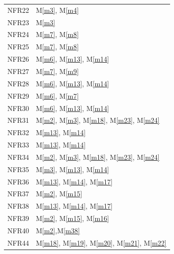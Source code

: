 \documentclass[12pt, titlepage]{article}
\newcommand{\mref}[1]{M\ref{#1}}
\begin{document}
\begin{longtable}{p{} p{}}
		NFR22 & \mref{m3}, \mref{m4} \\
		NFR23 & \mref{m3} \\
		\hline 
		\newpage
		\hline
		NFR24 & \mref{m7}, \mref{m8} \\
		NFR25 & \mref{m7}, \mref{m8} \\
		NFR26 & \mref{m6}, \mref{m13}, \mref{m14}\\
		NFR27 & \mref{m7}, \mref{m9}\\
		NFR28 & \mref{m6}, \mref{m13}, \mref{m14}\\
		NFR29 & \mref{m6}, \mref{m7}\\
		NFR30 & \mref{m6}, \mref{m13}, \mref{m14}\\
		NFR31 & \mref{m2}, \mref{m3}, \mref{m18}, \mref{m23}, \mref{m24} \\
		NFR32 & \mref{m13}, \mref{m14}\\
		NFR33 & \mref{m13}, \mref{m14}\\
		NFR34 & \mref{m2}, \mref{m3}, \mref{m18}, \mref{m23}, \mref{m24} \\
		NFR35 & \mref{m3}, \mref{m13}, \mref{m14} \\
		NFR36 & \mref{m13}, \mref{m14}, \mref{m17} \\
		NFR37 & \mref{m2}, \mref{m15} \\
		NFR38 & \mref{m13}, \mref{m14},  \mref{m17} \\
		NFR39 & \mref{m2}, \mref{m15}, \mref{m16} \\
		NFR40 & \mref{m2},\mref{m38} \\
		NFR44 & \mref{m18}, \mref{m19}, \mref{m20}, \mref{m21}, \mref{m22} \\
		\bottomrule
	\end{longtable}
\newpage
\end{document}
